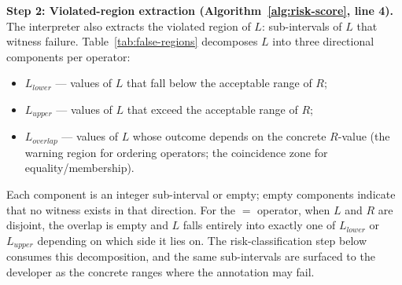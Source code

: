 \documentclass[pdflatex,sn-basic]{sn-jnl}%
\theoremstyle{thmstyleone}%
\theoremstyle{thmstyletwo}%
\theoremstyle{thmstylethree}%
\begin{document}
\smallskip
\noindent\textbf{Step 2: Violated-region extraction (Algorithm~\ref{alg:risk-score}, line 4).}
The interpreter also extracts the violated region of $L$: sub-intervals of $L$ that witness failure.
Table~\ref{tab:false-regions} decomposes $L$ into three directional components per operator:
\begin{itemize}
    \item $L_{\mathit{lower}}$ --- values of $L$ that fall below the acceptable range of $R$;
    \item $L_{\mathit{upper}}$ --- values of $L$ that exceed the acceptable range of $R$;
    \item $L_{\mathit{overlap}}$ --- values of $L$ whose outcome depends on the concrete $R$-value (the warning region for ordering operators; the coincidence zone for equality/membership).
\end{itemize}

Each component is an integer sub-interval or empty; empty components indicate that no witness exists in that direction.
For the $=$ operator, when $L$ and $R$ are disjoint, the overlap is empty and $L$ falls entirely into exactly one of $L_{\mathit{lower}}$ or $L_{\mathit{upper}}$ depending on which side it lies on.
The risk-classification step below consumes this decomposition, and the same sub-intervals are surfaced to the developer as the concrete ranges where the annotation may fail.
\end{document}
